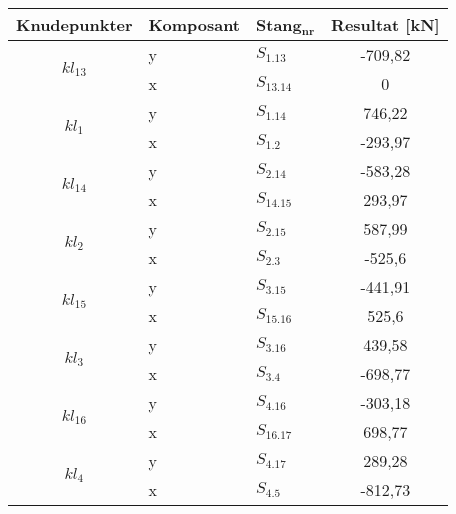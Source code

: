 \begin{table}[htbp]
\centering
\begin{tabular}{|c|l|l|c|}
\hline
\textbf{Knudepunkter}     & \textbf{Komposant} & \textbf{Stang$_{\textbf{nr}}$} & \textbf{Resultat [kN]} \\ \hline
\multirow{2}{*}{$kl_{13}$} & y                  & $S_{1.13}$            & -709,82           \\ \cline{2-4} 
                          & x                  & $S_{13.14}$           & 0                 \\ \hline
\multirow{2}{*}{$kl_1$}    & y                  & $S_{1.14}$            & 746,22          \\ \cline{2-4} 
                          & x                  & $S_{1.2}$             & -293,97           \\ \hline
\multirow{2}{*}{$kl_{14}$} & y                  & $S_{2.14}$            & -583,28           \\ \cline{2-4} 
                          & x                  & $S_{14.15}$           & 293,97           \\ \hline
\multirow{2}{*}{$kl_{2}$}  & y                  & $S_{2.15}$            & 587,99            \\ \cline{2-4} 
                          & x                  & $S_{2.3}$             & -525,6           \\ \hline
\multirow{2}{*}{$kl_{15}$} & y                  & $S_{3.15}$            & -441,91           \\ \cline{2-4} 
                          & x                  & $S_{15.16}$           & 525,6            \\ \hline
\multirow{2}{*}{$kl_{3}$}  & y                  & $S_{3.16}$            & 439,58            \\ \cline{2-4} 
                          & x                  & $S_{3.4}$             & -698,77         \\ \hline
\multirow{2}{*}{$kl_{16}$} & y                  & $S_{4.16}$            & -303,18           \\ \cline{2-4} 
                          & x                  & $S_{16.17}$           & 698,77           \\ \hline
\multirow{2}{*}{$kl_{4}$}  & y                  & $S_{4.17}$            & 289,28            \\ \cline{2-4} 
                          & x                  & $S_{4.5}$             & -812,73          \\ \hline

\end{tabular}
\end{table}
